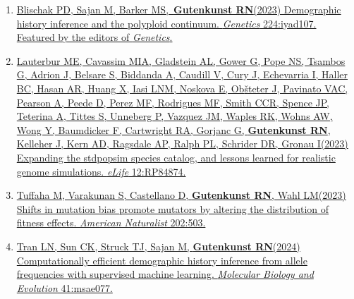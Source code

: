 \documentclass[11pt]{article}
\begin{document}
\begin{enumerate}
\item \href{https://doi.org/10.1093/genetics/iyad107}{Blischak PD\trainee\corresponding, Sajan M\trainee, Barker MS, \textbf{Gutenkunst RN}\corresponding (2023) Demographic history inference and the polyploid continuum. \emph{Genetics} 224:iyad107.}\\
 \href{}{Featured by the editors of \emph{Genetics}.}

\item \href{https://doi.org/10.7554/eLife.84874}{Lauterbur ME\equal, Cavassim MIA\equal, Gladstein AL\equal, Gower G\equal, Pope NS\equal, Tsambos G\equal, Adrion J, Belsare S, Biddanda A, Caudill V, Cury J, Echevarria I, Haller BC, Hasan AR, Huang X, Iasi LNM, Noskova E, Ob{\v s}teter J, Pavinato VAC, Pearson A, Peede D, Perez MF, Rodrigues MF, Smith CCR, Spence JP, Teterina A, Tittes S, Unneberg P, Vazquez JM, Waples RK, Wohns AW, Wong Y, Baumdicker F, Cartwright RA, Gorjanc G, \textbf{Gutenkunst RN}, Kelleher J, Kern AD, Ragsdale AP, Ralph PL, Schrider DR, Gronau I\corresponding (2023) Expanding the stdpopsim species catalog, and lessons learned for realistic genome simulations. \emph{eLife} 12:RP84874.}

\item \href{https://doi.org/10.1086/726010}{Tuffaha M, Varakunan S, Castellano D\trainee, \textbf{Gutenkunst RN}, Wahl LM\corresponding (2023) Shifts in mutation bias promote mutators by altering the distribution of fitness effects. \emph{American Naturalist} 202:503.}

\item \href{https://doi.org/10.1093/molbev/msae077}{Tran LN\trainee, Sun CK\trainee, Struck TJ\trainee, Sajan M\trainee, \textbf{Gutenkunst RN}\corresponding (2024) Computationally efficient demographic history inference from allele frequencies with supervised machine learning. \emph{Molecular Biology and Evolution} 41:msae077.}

\end{enumerate}
\end{document}
